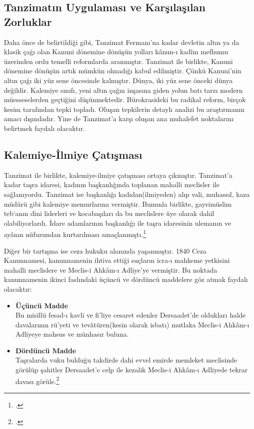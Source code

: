 \subsection{Tanzimatın Uygulaması ve Karşılaşılan Zorluklar}
\indent\indent Daha önce de belirtildiği gibi, Tanzimat Fermanı'na kadar devletin altın ya da klasik çağı olan Kanuni dönemine dönüşün yolları kânun-ı kadîm mefhumu üzerinden ordu temelli reformlarda aranmıştır.
Tanzimat ile birlikte, Kanuni dönemine dönüşün artık mümkün olmadığı kabul edilmiştir. Çünkü Kanuni'nin altın çağı iki yüz sene öncesinde kalmıştır. Dünya, iki yüz sene önceki dünya değildir. 
Kalemiye sınıfı, yeni altın çağın inşasına giden yolun batı tarzı modern müesseselerden geçtiğini düşünmektedir. Bürokrasideki bu radikal reform, birçok kesim tarafından tepki topladı. Oluşan tepkilerin 
detaylı analizi bu araştırmanın amacı dışındadır. Yine de Tanzimat'a karşı oluşan ana muhalefet noktalarını belirtmek faydalı olacaktır.

\subsection{Kalemiye-İlmiye Çatışması}
\indent\indent Tanzimat ile birlikte, kalemiye-ilmiye çatışması ortaya çıkmıştır. Tanzimat'a kadar taşra idaresi, kadının başkanlığında toplanan mahalli meclisler ile sağlanıyordu. 
Tanzimat ise başkanlığı kadıdan(ilmiyeden) alıp vali, muhassıl, kaza müdürü gibi kalemiye memurlarına vermiştir. Bununla birlikte, gayrimüslim teb`anın dini liderleri ve kocabaşıları da bu meclislere
üye olarak dahil olabiliyorlardı. İdare adamlarının başkanlığı ile taşra idaresinin ulemanın ve ayânın nüfuzundan kurtarılması amaçlanmıştı.\footcite[181]{tanzimat}

Diğer bir tartışma ise ceza hukuku alanında yaşanmıştır. 1840 Ceza Kanunnamesi, kanunnamenin ihtiva ettiği suçların icra-ı mahkeme yetkisini mahalli meclislere ve Meclis-i Ahkâm-ı Adliye'ye vermiştir. Bu noktada
kanunnamenin ikinci faslındaki üçüncü ve dördüncü maddelere göz atmak faydalı olacaktır:
\begin{itemize}
    \item \textbf{Üçüncü Madde}\\
    Bu misillü fesad-ı kavli ve fi'liye cesaret edenler Dersaadet'de oldukları halde davalarının rü'yeti ve tevâtüren(kesin olarak isbatı) mutlaka Meclis-i Ahkâm-ı Adliyeye mahsus ve münhasır buluna.
    \item \textbf{Dördüncü Madde}\\
    Taşralarda vuku bulduğu takdirde dahi evvel emirde memleket meclisinde görülüp şahitler Dersaadet'e celp ile kezalik Meclis-i Ahkâm-ı Adliyede tekrar davası görüle.\footcite[812]{islam_osmanli_hukuku}
\end{itemize}

